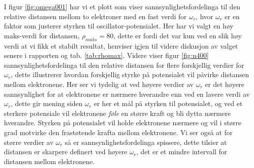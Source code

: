 \documentclass[norsk, 12pt]{article}
\theoremstyle{definition} \newtheorem{defi}{Definisjon}[subsection]
\theoremstyle{definition} \newtheorem{teo}{Teorem}[subsection]
\theoremstyle{definition} \newtheorem*{eks}{Eksempel}
\begin{document}
I figur \ref{fig:omega001} har vi et plott som viser sannsynlighetsfordelinga til den relative distansen mellom to elektroner med en fast verdi for $\omega_r$, hvor $\omega_r$ er en faktor som justerer styrken til oscillator-potensialet. Her har vi valgt en høy maks-verdi for distansen, $\rho_{maks} = 80$, dette er fordi det var kun ved en slik høy verdi at vi fikk et stabilt resultat, henviser igjen til videre diskusjon av valget senere i rapporten og tab. \ref{tab:rhomax}. Videre viser figur \ref{fig:n400} sannsynlighetsfordelinga til den relative distansen for flere forskjellig verdier for $\omega_r$, dette illustrerer hvordan forskjellig styrke på potensialet vil påvirke distansen mellom elektronene. Her ser vi tydelig at ved høyere verdier av $\omega_r$ er det høyere sannsynlighet for at elektronene er nærmere hverandre enn ved en lavere verdi av $\omega_r$, dette gir mening siden $\omega_r$ er her et mål på styrken til potensialet, og ved et sterkere potensiale vil elektronene \emph{føle} en større kraft og bli dytta nærmere hverandre. Styrken på potensialet vil holde elektronene nærmere og vil i større grad motvirke den frastøtende krafta mellom elektronene. Vi ser også at for større verdier av $\omega_r$ så er sannsynlighetsfordelinga spissere, dette tilsier at distansen er skarpere definert ved høyere $\omega_r$, det er et mindre intervall for distansen mellom elektronene.  
\end{document}
